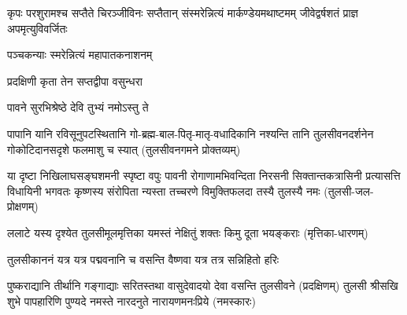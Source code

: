 
{कृपः परशुरामश्च सप्तैते चिरञ्जीविनः}
{सप्तैतान् संस्मरेन्नित्यं मार्कण्डेयमथाष्टमम्}
{जीवेद्वर्षशतं प्राज्ञ अपमृत्युविवर्जितः}

{पञ्चकन्याः स्मरेन्नित्यं महापातकनाशनम्}


{प्रदक्षिणी कृता तेन सप्तद्वीपा वसुन्धरा}

{पावने सुरभिश्रेष्ठे देवि तुभ्यं नमोऽस्तु ते}

\closesection

\fourlineindentedshloka
{पापानि यानि रविसूनुपटस्थितानि}
{गो-ब्रह्म-बाल-पितृ-मातृ-वधादिकानि}
{नश्यन्ति तानि तुलसीवनदर्शनेन}
{गोकोटिदानसदृशे फलमाशु च स्यात्}
{(तुलसीवनगमने प्रोक्तव्यम्)}

\fourlineindentedshloka
{या दृष्टा निखिलाघसङ्घशमनी स्पृष्टा वपुः पावनी}
{रोगाणामभिवन्दिता निरसनी सिक्तान्तकत्रासिनी}
{प्रत्यासत्ति विधायिनी भगवतः कृष्णस्य संरोपिता}
{न्यस्ता तच्चरणे विमुक्तिफलदा तस्यै तुलस्यै नमः}
(तुलसी-जल-प्रोक्षणम्)

\twolineshloka
{ललाटे यस्य दृश्येत तुलसीमूलमृत्तिका}
{यमस्तं नेक्षितुं शक्तः किमु दूता भयङ्कराः}
(मृत्तिका-धारणम्)

\twolineshloka
{तुलसीकाननं यत्र यत्र पद्मवनानि च}
{वसन्ति वैष्णवा यत्र तत्र सन्निहितो हरिः}

\twolineshloka
{पुष्कराद्यानि तीर्थानि गङ्गाद्याः सरितस्तथा}
{वासुदेवादयो देवा वसन्ति तुलसीवने}
(प्रदक्षिणम्)
\twolineshloka
{तुलसी श्रीसखि शुभे पापहारिणि पुण्यदे}
{नमस्ते नारदनुते नारायणमनःप्रिये}
 (नमस्कारः)

\closesection
